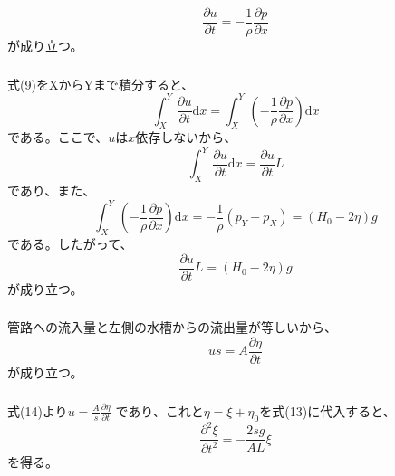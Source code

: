 \documentclass[a4paper]{jsarticle}
\begin{document}
\subsubsection{}
\begin{equation}
  \frac{\partial u}{\partial t}
  = - \frac{1}{\rho} \frac{\partial p}{\partial x}
\end{equation}
が成り立つ。

\subsubsection{}
式(9)をXからYまで積分すると、
\begin{equation}
  \int_X^Y \frac{\partial u}{\partial t} \mathrm{d} x
  = \int_X^Y \left(-\frac{1}{\rho} \frac{\partial p}{\partial x}\right) \mathrm{d} x
\end{equation}
である。ここで、$u$は$x$依存しないから、
\begin{equation}
  \int_X^Y \frac{\partial u}{\partial t} \mathrm{d} x
  = \frac{\partial u}{\partial t} L
\end{equation}
であり、また、
\begin{equation}
  \int_X^Y \left(-\frac{1}{\rho} \frac{\partial p}{\partial x}\right) \mathrm{d} x
  = -\frac{1}{\rho} (p_Y - p_X)
  = (H_0 - 2 \eta) g
\end{equation}
である。したがって、
\begin{equation}
  \frac{\partial u}{\partial t} L
  = (H_0 - 2 \eta) g
\end{equation}
が成り立つ。

\subsubsection{}
管路への流入量と左側の水槽からの流出量が等しいから、
\begin{equation}
  u s = A \frac{\partial \eta}{\partial t}
\end{equation}
が成り立つ。

\subsubsection{}
式(14)より$u = \frac{A}{s} \frac{\partial \eta}{\partial t}$
であり、これと$\eta = \xi + \eta_0$を式(13)に代入すると、
\begin{equation}
  \frac{\partial^2 \xi}{\partial t^2}
  = -\frac{2 s g}{A L} \xi
\end{equation}
を得る。
\end{document}
